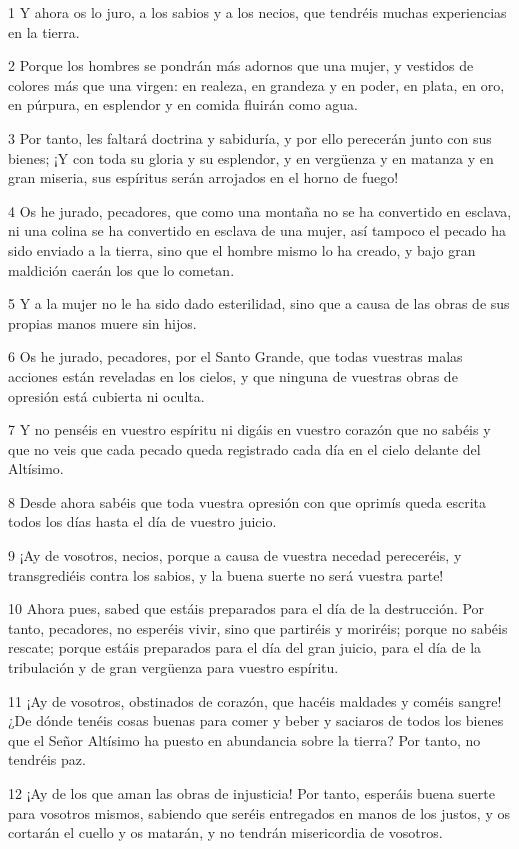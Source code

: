 \par 1 Y ahora os lo juro, a los sabios y a los necios, que tendréis muchas experiencias en la tierra.
\par 2 Porque los hombres se pondrán más adornos que una mujer, y vestidos de colores más que una virgen: en realeza, en grandeza y en poder, en plata, en oro, en púrpura, en esplendor y en comida fluirán como agua.
\par 3 Por tanto, les faltará doctrina y sabiduría, y por ello perecerán junto con sus bienes; ¡Y con toda su gloria y su esplendor, y en vergüenza y en matanza y en gran miseria, sus espíritus serán arrojados en el horno de fuego!
\par 4 Os he jurado, pecadores, que como una montaña no se ha convertido en esclava, ni una colina se ha convertido en esclava de una mujer, así tampoco el pecado ha sido enviado a la tierra, sino que el hombre mismo lo ha creado, y bajo gran maldición caerán los que lo cometan.
\par 5 Y a la mujer no le ha sido dado esterilidad, sino que a causa de las obras de sus propias manos muere sin hijos.
\par 6 Os he jurado, pecadores, por el Santo Grande, que todas vuestras malas acciones están reveladas en los cielos, y que ninguna de vuestras obras de opresión está cubierta ni oculta.
\par 7 Y no penséis en vuestro espíritu ni digáis en vuestro corazón que no sabéis y que no veis que cada pecado queda registrado cada día en el cielo delante del Altísimo.
\par 8 Desde ahora sabéis que toda vuestra opresión con que oprimís queda escrita todos los días hasta el día de vuestro juicio.
\par 9 ¡Ay de vosotros, necios, porque a causa de vuestra necedad pereceréis, y transgrediéis contra los sabios, y la buena suerte no será vuestra parte!
\par 10 Ahora pues, sabed que estáis preparados para el día de la destrucción. Por tanto, pecadores, no esperéis vivir, sino que partiréis y moriréis; porque no sabéis rescate; porque estáis preparados para el día del gran juicio, para el día de la tribulación y de gran vergüenza para vuestro espíritu.
\par 11 ¡Ay de vosotros, obstinados de corazón, que hacéis maldades y coméis sangre! ¿De dónde tenéis cosas buenas para comer y beber y saciaros de todos los bienes que el Señor Altísimo ha puesto en abundancia sobre la tierra? Por tanto, no tendréis paz.
\par 12 ¡Ay de los que aman las obras de injusticia! Por tanto, esperáis buena suerte para vosotros mismos, sabiendo que seréis entregados en manos de los justos, y os cortarán el cuello y os matarán, y no tendrán misericordia de vosotros.

